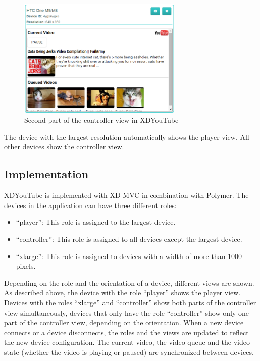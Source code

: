 \begin{figure}[h!]
  \centering
    \includegraphics[width=0.7\textwidth]{images/screenshots/xdyt/controller_landscape_2.png}
	\caption[Screenshot XDYouTube: Controller view (second part)]{Second part of the controller view in XDYouTube}
	\label{fig:xdyt_controller_landscape}
\end{figure}

The device with the largest resolution automatically shows the player view. All other devices show the controller view. 

\subsection{Implementation}

XDYouTube is implemented with XD-MVC in combination with Polymer. The devices in the application can have three different roles:
\begin{itemize}
	\item ``player'': This role is assigned to the largest device.
	\item ``controller'': This role is assigned to all devices except the largest device.
	\item ``xlarge'': This role is assigned to devices with a width of more than 1000 pixels.
\end{itemize}
Depending on the role and the orientation of a device, different views are shown. As described above, the device with the role ``player'' shows the player view. Devices with the roles ``xlarge'' and ``controller'' show both parts of the controller view simultaneously, devices that only have the role ``controller'' show only one part of the controller view, depending on the orientation. When a new device connects or a device disconnects, the roles and the views are updated to reflect the new device configuration. The current video, the video queue and the video state (whether the video is playing or paused) are synchronized between devices. 

